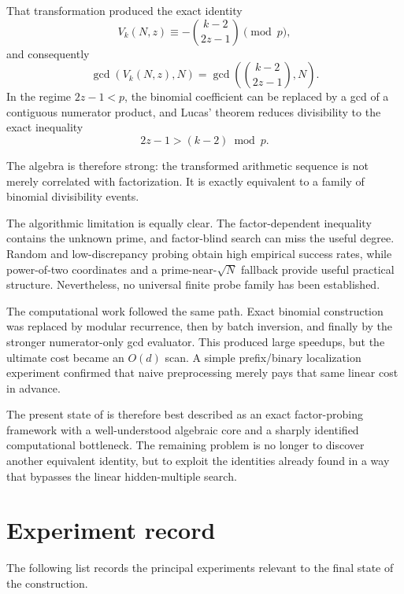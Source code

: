 \documentclass[11pt,a4paper]{article}
\newcommand{\Arith}{\mathrm{ArithSeg}}
\begin{document}
That transformation produced the exact identity
\[
V_k(N,z)
\equiv
-\binom{k-2}{2z-1}
\pmod p,
\]
and consequently
\[
\gcd(V_k(N,z),N)
=
\gcd\!\left(\binom{k-2}{2z-1},N\right).
\]
In the regime $2z-1<p$, the binomial coefficient can be replaced by a gcd of a contiguous numerator product, and Lucas' theorem reduces divisibility to the exact inequality
\[
2z-1>(k-2)\bmod p.
\]

The algebra is therefore strong: the transformed arithmetic sequence is not merely correlated with factorization. It is exactly equivalent to a family of binomial divisibility events.

The algorithmic limitation is equally clear. The factor-dependent inequality contains the unknown prime, and factor-blind search can miss the useful degree. Random and low-discrepancy probing obtain high empirical success rates, while power-of-two coordinates and a prime-near-$\sqrt N$ fallback provide useful practical structure. Nevertheless, no universal finite probe family has been established.

The computational work followed the same path. Exact binomial construction was replaced by modular recurrence, then by batch inversion, and finally by the stronger numerator-only gcd evaluator. This produced large speedups, but the ultimate cost became an $O(d)$ scan. A simple prefix/binary localization experiment confirmed that naive preprocessing merely pays that same linear cost in advance.

The present state of \Arith{} is therefore best described as an exact factor-probing framework with a well-understood algebraic core and a sharply identified computational bottleneck. The remaining problem is no longer to discover another equivalent identity, but to exploit the identities already found in a way that bypasses the linear hidden-multiple search.

\appendix
\section{Experiment record}
\label{app:experiments}

The following list records the principal experiments relevant to the final state of the construction.
\end{document}
